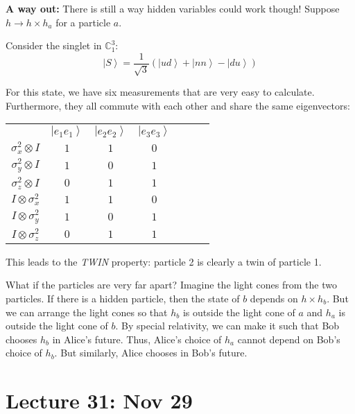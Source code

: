 \documentclass[12pt]{article}
\newcommand{\C}{\mathbb{C}}
\newcommand{\ket}[1]{\left\vert #1 \right\rangle}
\begin{document}
        \textbf{A way out:} There is still a way hidden variables could work though! Suppose $h \to h \times h_a$ for a particle $a$.

        Consider the singlet in $\C_1^3$:
        \[\ket{S} = \frac{1}{\sqrt 3}(\ket{ud} + \ket{nn} - \ket{du})\]

        For this state, we have six measurements that are very easy to calculate. Furthermore, they all commute with each other and share the same eigenvectors: 
        \begin{center}
            \begin{tabular*}{2in}{|c|cccccc|}
                \hline 
                & $\ket{e_1e_1}$ & $\ket{e_2e_2}$ & $\ket{e_3e_3}$\\
                $\sigma_x^2 \otimes I$ & $1$ & $1$ & $0$\\
                $\sigma_y^2 \otimes I$ & $1$ & $0$ & $1$\\
                $\sigma_z^2 \otimes I$ & $0$ & $1$ & $1$\\
                $I \otimes \sigma_x^2$ & $1$ & $1$ & $0$\\
                $I \otimes \sigma_y^2$ & $1$ & $0$ & $1$\\
                $I \otimes \sigma_z^2$ & $0$ & $1$ & $1$\\
                \hline
            \end{tabular*}
        \end{center}

        This leads to the \emph{TWIN} property: particle 2 is clearly a twin of particle 1.

        What if the particles are very far apart? Imagine the light cones from the two particles. If there is a hidden particle, then the state of $b$ depends on $h \times h_b$. But we can arrange the light cones so that $h_b$ is outside the light cone of $a$ and $h_a$ is outside the light cone of $b$. By special relativity, we can make it such that Bob chooses $h_b$ in Alice's future. Thus, Alice's choice of $h_a$ cannot depend on Bob's choice of $h_b$. But similarly, Alice chooses in Bob's future.

\section*{Lecture 31: Nov 29}
\end{document}
